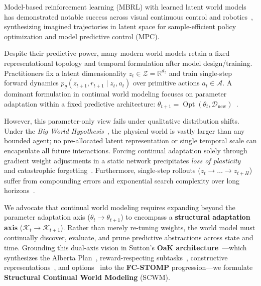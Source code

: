 \documentclass{article}
\theoremstyle{definition}
\begin{document}
Model-based reinforcement learning (MBRL) with learned latent world models has demonstrated notable success across visual continuous control and robotics~\citep{ha2018world, hafner2019learning, hafner2020dream, hafner2023mastering, hansen2024tdmpc2, richens2025general}, synthesizing imagined trajectories in latent space for sample-efficient policy optimization and model predictive control (MPC).

Despite their predictive power, many modern world models retain a fixed representational topology and temporal formulation after model design/training. Practitioners fix a latent dimensionality $z_t \in \mathcal{Z} = \mathbb{R}^{d_z}$ and train single-step forward dynamics $p_\theta(z_{t+1}, r_{t+1} \mid z_t, a_t)$ over primitive actions $a_t \in \mathcal{A}$. A dominant formulation in continual world modeling focuses on parameter adaptation within a fixed predictive architecture: $\theta_{t+1} = \operatorname{Opt}(\theta_t, \mathcal{D}_{\text{new}})$~\citep{kessler2023effectiveness, yang2024augmenting, liu2025continual}.

However, this parameter-only view fails under qualitative distribution shifts. Under the \emph{Big World Hypothesis}~\citep{javed2024bigworld, lewandowski2025world, elelimy2025rethinking}, the physical world is vastly larger than any bounded agent; no pre-allocated latent representation or single temporal scale can encapsulate all future interactions. Forcing continual adaptation solely through gradient weight adjustments in a static network precipitates \emph{loss of plasticity}~\citep{dohare2024loss} and catastrophic forgetting~\citep{fu2025knowledge}. Furthermore, single-step rollouts ($z_t \to \dots \to z_{t+H}$) suffer from compounding errors and exponential search complexity over long horizons~\citep{freed2023learning, jiralerspong2023forecaster}.

We advocate that continual world modeling requires expanding beyond the parameter adaptation axis ($\theta_t \to \theta_{t+1}$) to encompass a \textbf{structural adaptation axis} ($\mathcal{K}_t \to \mathcal{K}_{t+1}$). Rather than merely re-tuning weights, the world model must continually discover, evaluate, and prune predictive abstractions across state and time. Grounding this dual-axis vision in Sutton's \textbf{OaK architecture}~\citep{sutton2025oak}---which synthesizes the Alberta Plan~\citep{sutton2022alberta}, reward-respecting subtasks~\citep{sutton2023subtasks}, constructive representations~\citep{javed2023constructive, javed2019meta}, and options~\citep{sutton1999between, sutton1998intra} into the \textbf{FC-STOMP} progression---we formulate \textbf{Structural Continual World Modeling} (SCWM).
\end{document}
